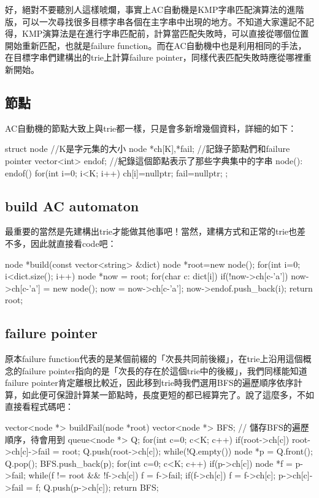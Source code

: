 好，絕對不要聽別人這樣唬爛，事實上AC自動機是KMP字串匹配演算法的進階版，可以一次尋找很多目標字串各個在主字串中出現的地方。不知道大家還記不記得，KMP演算法是在進行字串匹配前，計算當匹配失敗時，可以直接從哪個位置開始重新匹配，也就是failure function。而在AC自動機中也是利用相同的手法，在目標字串們建構出的trie上計算failure pointer，同樣代表匹配失敗時應從哪裡重新開始。
\subsection{節點}
AC自動機的節點大致上與trie都一樣，只是會多新增幾個資料，詳細的如下：
\begin{C++}
struct node{ //K是字元集的大小
	node *ch[K],*fail; //記錄子節點們和failure pointer
	vector<int> endof; //紀錄這個節點表示了那些字典集中的字串
	node(): endof(){
		for(int i=0; i<K; i++) ch[i]=nullptr;
		fail=nullptr;
	}
};
\end{C++}
\subsection{build AC automaton}
最重要的當然是先建構出trie才能做其他事吧！當然，建構方式和正常的trie也差不多，因此就直接看code吧：
\begin{C++}
node *build(const vector<string> &dict) {
    node *root=new node();
    for(int i=0; i<dict.size(); i++) {
		node *now = root;
		for(char c: dict[i]) {
			if(!now->ch[c-'a'])
				now->ch[c-'a'] = new node();
			now = now->ch[c-'a'];
		}
		now->endof.push_back(i);
    }
    return root;
}
\end{C++}
\subsection{failure pointer}
原本failure function代表的是某個前綴的「次長共同前後綴」，在trie上沿用這個概念的failure pointer指向的是「次長的存在於這個trie中的後綴」，我們同樣能知道failure pointer肯定離根比較近，因此移到trie時我們選用BFS的遍歷順序依序計算，如此便可保證計算某一節點時，長度更短的都已經算完了。說了這麼多，不如直接看程式碼吧：
\begin{C++}
vector<node *> buildFail(node *root) {
	vector<node *> BFS; // 儲存BFS的遍歷順序，待會用到
	queue<node *> Q;
	for(int c=0; c<K; c++) {
		if(root->ch[c]) {
			root->ch[c]->fail = root;
			Q.push(root->ch[c]);
		}
	}
	while(!Q.empty()) {
		node *p = Q.front(); Q.pop();
		BFS.push_back(p);
		for(int c=0; c<K; c++) if(p->ch[c]) {
			node *f = p->fail;
			while(f != root && !f->ch[c]) f = f->fail;
			if(f->ch[c]) f = f->ch[c];
			p->ch[c]->fail = f;
			Q.push(p->ch[c]);
		}
	}
	return BFS;
}
\end{C++}

